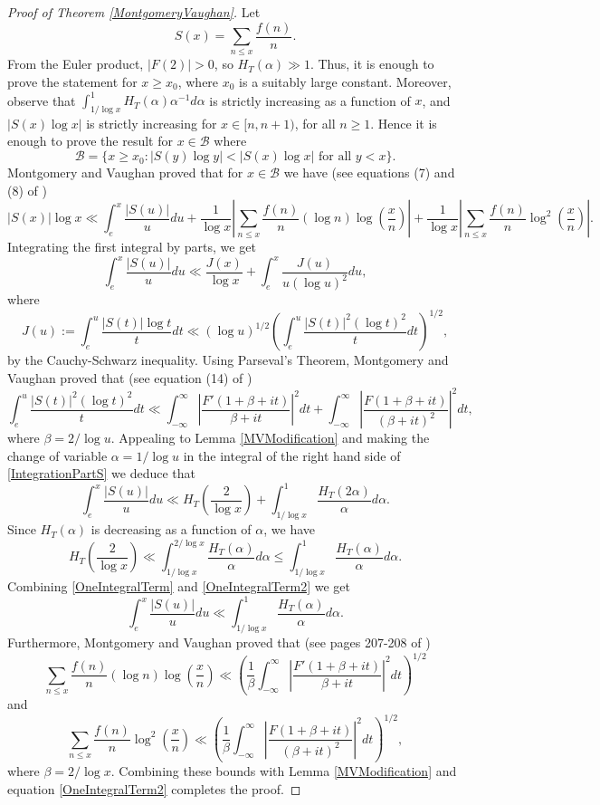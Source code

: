 \documentclass[12pt]{amsart}
\theoremstyle{definition}
\numberwithin{equation}{section}
\begin{document}
\begin{proof}[Proof of Theorem \ref{MontgomeryVaughan}]
Let
$$S(x)=\sum_{n\leq x} \frac{f(n)}{n}.$$
From the Euler product, $|F(2)|>0$, so $H_{T}(\alpha)\gg 1$. Thus, it is enough to prove the statement for $x\geq x_0$, where $x_0$ is a suitably large constant. Moreover, observe that $\int_{1/\log x}^1H_{T}(\alpha)\alpha^{-1} d\alpha$ is strictly increasing as a function of $x$, and $|S(x)\log x|$ is strictly increasing for $x\in [n, n+1)$, for all $n\geq 1$. Hence it is enough to prove the result for $x\in \mathcal{B}$ where
$$\mathcal{B}=\{ x\geq x_0: |S(y)\log y| < |S(x)\log x| \text{ for all } y<x\}.$$
Montgomery and Vaughan proved that for $x\in \mathcal{B}$ we have (see equations (7) and (8) of \cite{MV})
$$
|S(x)|\log x \ll \int_e^x \frac{|S(u)|}{u}du+ \frac{1}{\log x} \left|\sum_{n\leq x} \frac{f(n)}{n}(\log n)\log\left(\frac xn\right)\right| +  \frac{1}{\log x} \left|\sum_{n\leq x} \frac{f(n)}{n}\log^2\left(\frac xn\right)\right|.
$$
Integrating the first integral by parts, we get
\begin{equation}\label{IntegrationPartS} \int_e^x \frac{|S(u)|}{u}du \ll \frac{J(x)}{\log x} +\int_{e}^x \frac{J(u)}{u(\log u)^2} du,
\end{equation}
where
$$J(u):= \int_{e}^u \frac{|S(t)|\log t}{t} dt \ll (\log u)^{1/2} \left(\int_e^u \frac{|S(t)|^2(\log t)^2}{t} dt\right)^{1/2},
$$
by the Cauchy-Schwarz inequality. Using Parseval's Theorem, Montgomery and Vaughan proved that (see equation (14) of \cite{MV}) 
$$\int_e^u \frac{|S(t)|^2(\log t)^2}{t} dt \ll \int_{-\infty}^{\infty}\left|\frac{F'(1+\beta+it)}{\beta+it}\right|^2 dt+ \int_{-\infty}^{\infty}\left|\frac{F(1+\beta+it)}{(\beta+it)^2}\right|^2 dt,$$
where $\beta=2/\log u$. Appealing to Lemma \ref{MVModification} and making the change of variable $\alpha=1/\log u$ in the integral of the right hand side of \eqref{IntegrationPartS} we deduce that
\begin{equation}\label{OneIntegralTerm}
\int_e^x \frac{|S(u)|}{u}du \ll H_{T}\left(\frac{2}{\log x}\right)+ \int_{1/\log x}^1\frac{H_{T}(2\alpha)}{\alpha} d\alpha.
\end{equation}
Since $H_{T}(\alpha)$ is decreasing as a function of $\alpha$, we have
\begin{equation}\label{OneIntegralTerm2}
H_{T}\left(\frac{2}{\log x}\right)\ll \int_{1/\log x}^{2/\log x} \frac{H_{T}(\alpha)}{\alpha} d\alpha \leq \int_{1/\log x}^1\frac{H_{T}(\alpha)}{\alpha} d\alpha.
\end{equation}
Combining \eqref{OneIntegralTerm} and \eqref{OneIntegralTerm2} we get
$$\int_e^x \frac{|S(u)|}{u}du\ll \int_{1/\log x}^1\frac{H_{T}(\alpha)}{\alpha} d\alpha.$$
Furthermore, Montgomery and Vaughan proved that (see pages 207-208 of \cite{MV})
$$ \sum_{n\leq x} \frac{f(n)}{n}(\log n)\log\left(\frac xn\right) \ll \left(\frac{1}{\beta} \int_{-\infty}^{\infty}\left|\frac{F'(1+\beta+it)}{\beta+it}\right|^2 dt\right)^{1/2}
$$
and 
$$  \sum_{n\leq x} \frac{f(n)}{n}\log^2\left(\frac xn\right)\ll \left(\frac{1}{\beta} \int_{-\infty}^{\infty}\left|\frac{F(1+\beta+it)}{(\beta+it)^2}\right|^2 dt\right)^{1/2},
$$
where $\beta=2/\log x$. Combining these bounds with Lemma \ref{MVModification} and equation \eqref{OneIntegralTerm2} completes the proof.
\end{proof}
\end{document}
